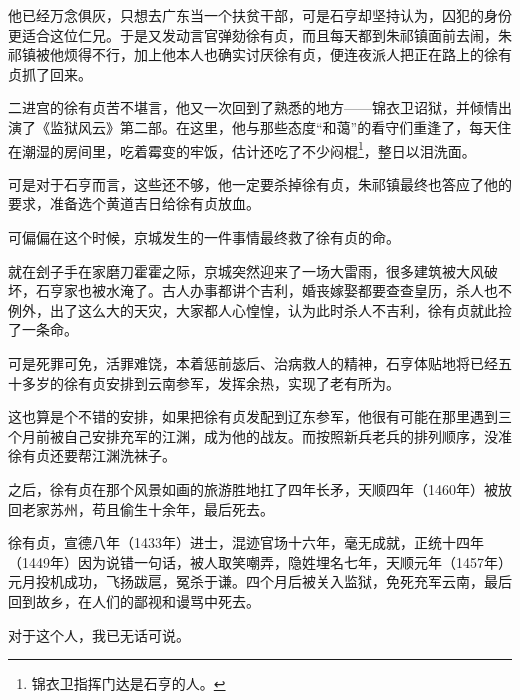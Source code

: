 \begin{multicols}{\theparacolNo}
		他已经万念俱灰，只想去广东当一个扶贫干部，可是石亨却坚持认为，囚犯的身份更适合这位仁兄。于是又发动言官弹劾徐有贞，而且每天都到朱祁镇面前去闹，朱祁镇被他烦得不行，加上他本人也确实讨厌徐有贞，便连夜派人把正在路上的徐有贞抓了回来。

		二进宫的徐有贞苦不堪言，他又一次回到了熟悉的地方——锦衣卫诏狱，并倾情出演了《监狱风云》第二部。在这里，他与那些态度“和蔼”的看守们重逢了，每天住在潮湿的房间里，吃着霉变的牢饭，估计还吃了不少闷棍\footnote{锦衣卫指挥门达是石亨的人。}，整日以泪洗面。

		可是对于石亨而言，这些还不够，他一定要杀掉徐有贞，朱祁镇最终也答应了他的要求，准备选个黄道吉日给徐有贞放血。

		可偏偏在这个时候，京城发生的一件事情最终救了徐有贞的命。

		就在刽子手在家磨刀霍霍之际，京城突然迎来了一场大雷雨，很多建筑被大风破坏，石亨家也被水淹了。古人办事都讲个吉利，婚丧嫁娶都要查查皇历，杀人也不例外，出了这么大的天灾，大家都人心惶惶，认为此时杀人不吉利，徐有贞就此捡了一条命。

		可是死罪可免，活罪难饶，本着惩前毖后、治病救人的精神，石亨体贴地将已经五十多岁的徐有贞安排到云南参军，发挥余热，实现了老有所为。

		这也算是个不错的安排，如果把徐有贞发配到辽东参军，他很有可能在那里遇到三个月前被自己安排充军的江渊，成为他的战友。而按照新兵老兵的排列顺序，没准徐有贞还要帮江渊洗袜子。

		之后，徐有贞在那个风景如画的旅游胜地扛了四年长矛，天顺四年（1460年）被放回老家苏州，苟且偷生十余年，最后死去。

		徐有贞，宣德八年（1433年）进士，混迹官场十六年，毫无成就，正统十四年（1449年）因为说错一句话，被人取笑嘲弄，隐姓埋名七年，天顺元年（1457年）元月投机成功，飞扬跋扈，冤杀于谦。四个月后被关入监狱，免死充军云南，最后回到故乡，在人们的鄙视和谩骂中死去。

		对于这个人，我已无话可说。
		\ifnum{}
	\end{multicols}
\fi
\newpage
